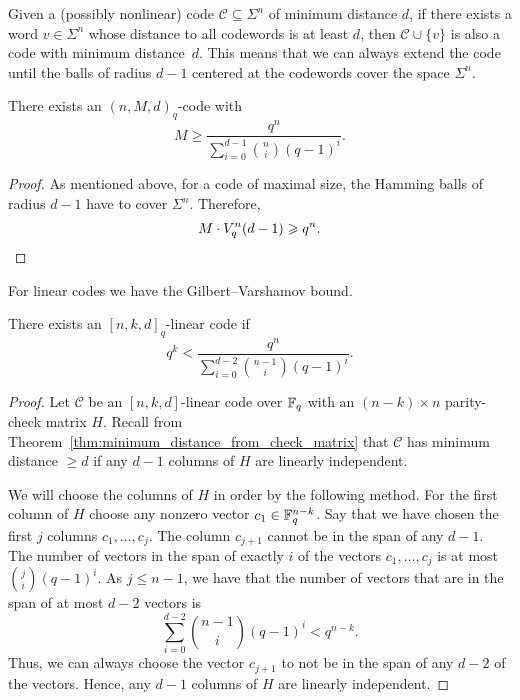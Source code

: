 \documentclass[../main.tex]{subfiles}
\begin{document}
Given a (possibly nonlinear) code $\mathcal{C} \subseteq \Sigma^n$ of minimum distance $d$, if there exists a word $v \in \Sigma^n$ whose distance to all codewords is at least $d$, then $\mathcal{C} \cup \{v\}$ is also a code with minimum distance~$d$. This means that we can always extend the code until the balls of radius $d - 1$ centered at the codewords cover the space $\Sigma^n$.

\begin{theorem}\label{thm:sphere_covering_bound}
There exists an $(n, M, d)_q$-code with
\begin{equation*}
    M \geq \frac{q^n}{\sum_{i=0}^{d-1} \binom{n}{i} (q - 1)^i}.
\end{equation*}
\end{theorem}

\begin{proof}
As mentioned above, for a code of maximal size, the Hamming balls of radius $d-1$ have to cover $\Sigma^n$. Therefore,
\begin{equation*}
    M \cdot V_q^n(d - 1) \geq q^n. \qedhere
\end{equation*}
\end{proof}

For linear codes we have the Gilbert--Varshamov bound.

\begin{theorem}\label{thm:Gilbert-Varshamov_bound}
There exists an $[n, k, d]_q$-linear code if
\begin{equation*}
    q^k < \frac{q^n}{\sum_{i=0}^{d-2} \binom{n-1}{i} (q - 1)^i}.
\end{equation*}
\end{theorem}

\begin{proof}
Let $\mathcal{C}$ be an $[n, k, d]$-linear code over $\F_q$ with an $(n-k) \times n$ parity-check matrix $H$. Recall from Theorem~\ref{thm:minimum_distance_from_check_matrix} that $\mathcal{C}$ has minimum distance $\geq d$ if any $d - 1$ columns of $H$ are linearly independent.

We will choose the columns of $H$ in order by the following method. For the first column of $H$ choose any nonzero vector $c_1 \in \F_q^{n - k}$. Say that we have chosen the first $j$ columns $c_1, \dots, c_j$. The column $c_{j+1}$ cannot be in the span of any $d - 1$. The number of vectors in the span of exactly $i$ of the vectors $c_1, \dots, c_j$ is at most $\binom{j}{i} (q - 1)^i$. As $j \leq n - 1$, we have that the number of vectors that are in the span of at most $d - 2$ vectors is
\begin{equation*}
    \sum_{i=0}^{d-2} \binom{n-1}{i} (q - 1)^i < q^{n - k}.
\end{equation*}
Thus, we can always choose the vector $c_{j+1}$ to not be in the span of any $d - 2$ of the vectors. Hence, any $d - 1$ columns of $H$ are linearly independent.
\end{proof}
\end{document}
